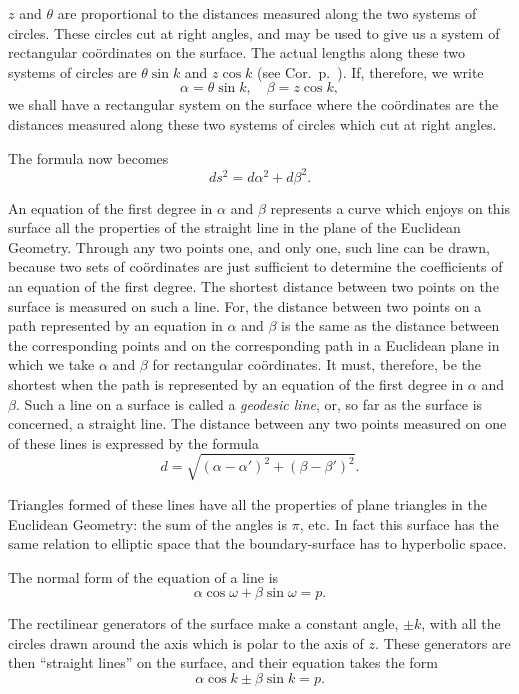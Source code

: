\begin{description}
$z$ and $\theta$ are proportional to the distances measured along
the two systems of circles. These circles cut at right angles, and
may be used to give us a system of rectangular coördinates on the
surface. The actual lengths along these two systems of circles are
$\theta\sin k$ and $z\cos k$ (see Cor.~p.~\pageref{p83ref}). If,
therefore, we write
\begin{equation*}
\alpha = \theta\sin k,\quad \beta = z\cos k,
\end{equation*}
we shall have a rectangular system on the surface where the
coördinates are the distances measured along these two systems of
circles which cut at right angles.

The formula now becomes
\begin{equation*}
ds^2 = d\alpha^2 + d\beta^2.
\end{equation*}

An equation of the first degree in $\alpha$ and $\beta$ represents a
curve which enjoys on this surface all the properties of the
straight line in the plane of the Euclidean Geometry. Through any
two points one, and only one, such line can be drawn, because two
sets of coördinates are just sufficient to determine the
coefficients of an equation of the first degree. The shortest
distance between two points on the surface is measured on such a
line. For, the distance between two points on a path represented by
an equation in $\alpha$ and $\beta$ is the same as the distance
between the corresponding points and on the corresponding path in a
Euclidean plane in which we take $\alpha$ and $\beta$ for
rectangular coördinates. It must, therefore, be the shortest when
the path is represented by an equation of the first degree in
$\alpha$ and $\beta$. Such a line on a surface is called a
\emph{geodesic line}, or, so far as the surface is concerned, a
straight line. The distance between any two points measured on one
of these lines is expressed by the formula
\begin{equation*}
d = \sqrt{(\alpha-\alpha')^2 + (\beta-\beta')^2}.
\end{equation*}

Triangles formed of these lines have all the properties of plane
triangles in the Euclidean Geometry: the sum of the angles is $\pi$,
etc. In fact this surface has the same relation to elliptic space
that the boundary-surface has to hyperbolic space.

The normal form of the equation of a line is
\begin{equation*}
\alpha\cos\omega + \beta\sin\omega = p.
\end{equation*}

The rectilinear generators of the surface make a constant angle,
$\pm k$, with all the circles drawn around the axis which is polar
to the axis of $z$. These generators are then ``straight lines'' on
the surface, and their equation takes the form
\begin{equation*}
\alpha\cos k \pm \beta\sin k = p.
\end{equation*}
\end{description}

